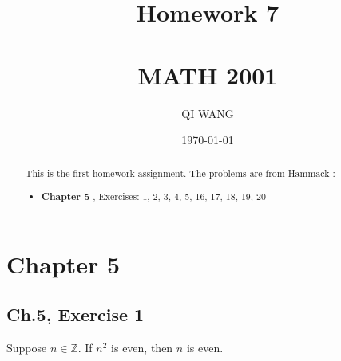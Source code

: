 \documentclass[12pt]{amsart}
\numberwithin{equation}{section}
\theoremstyle{definition}
\theoremstyle{remark}
\begin{document}




\author[QI]{QI WANG}
\address{University of Colorado, Department of Mathematics,  Campus Box 395,
Boulder, CO 80309-0395}
\date{\today}



\title[Homework 7]{Homework 7 \\ \ \\  MATH 2001}

\begin{abstract} 
This is the first homework assignment.  The problems are from Hammack \cite[Ch.5]{H13}:
\begin{itemize}

\item \textbf{Chapter 5}  
\textbf{}, Exercises:  1, 2, 3, 4, 5, 16, 17, 18, 19, 20

\end{itemize}
\end{abstract}


\maketitle


\tableofcontents





\section*{Chapter 5}



\subsection*{Ch.5,  Exercise 1}  Suppose $ n \in \mathbb{Z} $. If $ n^2 $ is even, then $ n $ is even.
\end{document}
